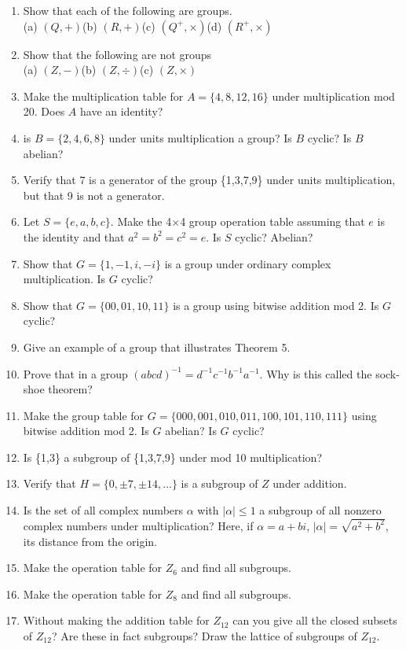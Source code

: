 \documentclass[12pt]{article}
\theoremstyle{definition}
\begin{document}
\begin{enumerate}
\item Show that each of the following are groups.\\
(a) $(Q,+)$\qquad(b) $(R,+)$\qquad(c) $(Q^+,\times)$\qquad(d) $(R^+,\times)$
\item Show that the following are not groups\\
(a) $(Z,-)$\qquad (b) $(Z,\div)$\qquad (c) $(Z,\times)$
\item Make the multiplication table for $A=\{4,8,12,16\}$ under multiplication mod 20.  Does $A$ have an identity?
\item is $B=\{2,4,6,8\}$ under units multiplication a group?  Is $B$ cyclic?  Is $B$ abelian?
\item Verify that 7 is a generator of the group \{1,3,7,9\} under units multiplication, but that 9 is not a generator.
\item Let $S=\{e,a,b,c\}$.  Make the 4$\times$4 group operation table assuming that $e$ is the identity and that $a^2=b^2=c^2=e$.  Is $S$ cyclic?  Abelian?
\item Show that $G=\{1,-1,i,-i\}$ is a group under ordinary complex multiplication.  Is $G$ cyclic?
\item Show that $G=\{00,01,10,11\}$ is a group using bitwise addition mod 2.  Is $G$ cyclic?
\item Give an example of a group that illustrates Theorem 5.
\item Prove that in a group $(abcd)^{-1}=d^{-1}c^{-1}b^{-1}a^{-1}$.  Why is this called the sock-shoe theorem?
\item Make the group table for $G=\{000,001,010,011,100,101,110,111\}$ using bitwise addition mod 2.  Is $G$ abelian?  Is $G$ cyclic?
\item Is \{1,3\} a subgroup of \{1,3,7,9\} under mod 10 multiplication?
\item Verify that $H=\{0,\pm7,\pm14,\dots\}$ is a subgroup of $Z$ under addition.
\item Is the set of all complex numbers $\alpha$ with $|\alpha|\leq1$ a subgroup of all nonzero complex numbers under multiplication?  Here, if $\alpha = a+bi$, $|\alpha|=\sqrt{a^2+b^2}$, its distance from the origin.
\item Make the operation table for $Z_6$ and find all subgroups.
\item Make the operation table for $Z_8$ and find all subgroups.
\item Without making the addition table for $Z_{12}$ can you give all the closed subsets of $Z_{12}$?  Are these in fact subgroups?  Draw the lattice of subgroups of $Z_{12}$.

\end{enumerate}
\end{document}
